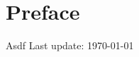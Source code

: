 \documentclass[12pt,oneside,openany]{memoir}
\begin{document}
    \chapter*{Preface}
    Asdf
    \vspace{-25pt}
    \tableofcontents
    \vfill
    \specialdate
    Last update: \today

    
\end{document}
